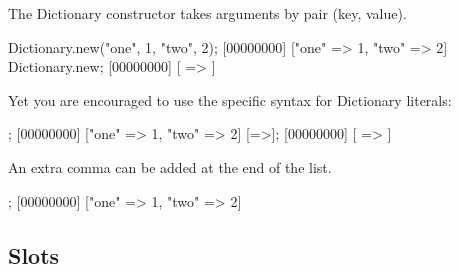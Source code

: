 The Dictionary constructor takes arguments by pair (key, value).

\begin{urbiscript}
Dictionary.new("one", 1, "two", 2);
[00000000] ["one" => 1, "two" => 2]
Dictionary.new;
[00000000] [ => ]
\end{urbiscript}

Yet you are encouraged to use the specific syntax for Dictionary
literals:

\begin{urbiscript}
["one" => 1, "two" => 2];
[00000000] ["one" => 1, "two" => 2]
[=>];
[00000000] [ => ]
\end{urbiscript}

An extra comma can be added at the end of the list.

\begin{urbiscript}
[
  "one" => 1,
  "two" => 2,
];
[00000000] ["one" => 1, "two" => 2]
\end{urbiscript}

\subsection{Slots}

